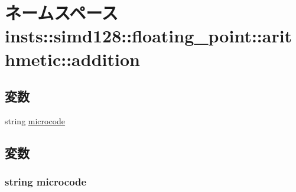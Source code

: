 \hypertarget{namespaceinsts_1_1simd128_1_1floating__point_1_1arithmetic_1_1addition}{
\section{ネームスペース insts::simd128::floating\_\-point::arithmetic::addition}
\label{namespaceinsts_1_1simd128_1_1floating__point_1_1arithmetic_1_1addition}
}
\subsection*{変数}
\begin{DoxyCompactItemize}
\item 
string \hyperlink{namespaceinsts_1_1simd128_1_1floating__point_1_1arithmetic_1_1addition_a770f11a173e99389a8802f0107ed8f52}{microcode}
\end{DoxyCompactItemize}


\subsection{変数}
\hypertarget{namespaceinsts_1_1simd128_1_1floating__point_1_1arithmetic_1_1addition_a770f11a173e99389a8802f0107ed8f52}{
\subsubsection[{microcode}]{\setlength{\rightskip}{0pt plus 5cm}string {\bf microcode}}}
\label{namespaceinsts_1_1simd128_1_1floating__point_1_1arithmetic_1_1addition_a770f11a173e99389a8802f0107ed8f52}
